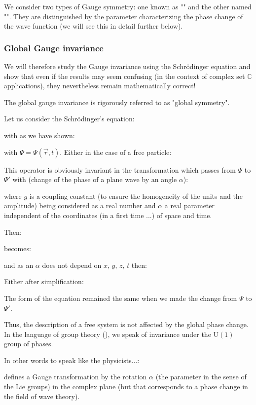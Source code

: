 	We consider two types of Gauge symmetry: one known as "" and the other named "". They are distinguished by the parameter characterizing the phase change of the wave function (we will see this in detail further below).
	
	\subsubsection{Global Gauge invariance}
	We will therefore study the Gauge invariance using the Schrödinger equation and show that even if the results may seem confusing (in the context of complex set $\mathbb{C}$ applications), they nevertheless remain mathematically correct!
	\begin{tcolorbox}[title=Remark,colframe=black,arc=10pt]
	The global gauge invariance is rigorously referred to as "global symmetry".
	\end{tcolorbox}
	Let us consider the Schrödinger's equation:
	
	with as we have shown:
	
	with $\Psi=\Psi(\vec{r},t)$. Either in the case of a free particle:
	
	This operator is obviously invariant in the transformation which passes from $\Psi$ to $\Psi'$ with (change of the phase of a plane wave by an angle $\alpha$):
	
	where $g$ is a coupling constant (to ensure the homogeneity of the units and the amplitude) being considered as a real number and $\alpha$ a real parameter independent of the coordinates (in a first time ...) of space and time.
	
	Then:
	
	becomes:
	
	and as an $\alpha$ does not depend on $x$, $y$, $z$, $t$ then:
	
	Either after simplification:
	
	The form of the equation remained the same when we made the change from $\Psi$ to $\Psi'$.
	
	Thus, the description of a free system is not affected by the global phase change. In the language of group theory (), we speak of invariance under the $\text{U}(1)$ group of  phases.

	In other words to speak like the physicists...:
	
	defines a Gauge transformation by the rotation $\alpha$ (the parameter in the sense of the Lie groups) in the complex plane (but that corresponds to a phase change in the field of wave theory).
	
